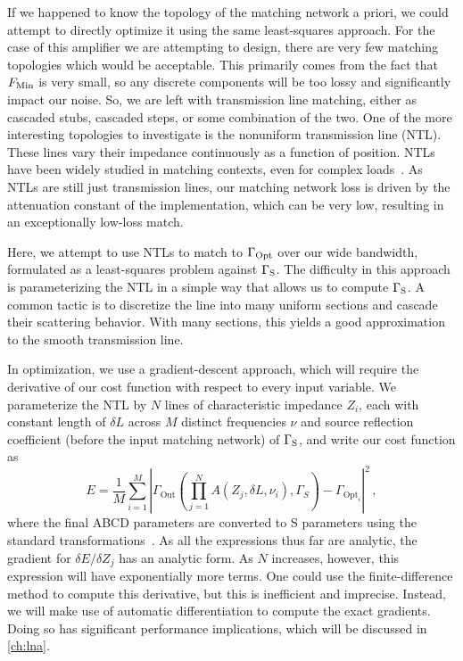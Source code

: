 If we happened to know the topology of the matching network a priori, we could attempt to directly optimize it using the same least-squares approach.
For the case of this amplifier we are attempting to design, there are very few matching topologies which would be acceptable.
This primarily comes from the fact that $F_{\text{Min}}$ is very small, so any discrete components will be too lossy and significantly impact our noise.
So, we are left with transmission line matching, either as cascaded stubs, cascaded steps, or some combination of the two.
One of the more interesting topologies to investigate is the nonuniform transmission line (NTL).
These lines vary their impedance continuously as a function of position.
NTLs have been widely studied in matching contexts, even for complex loads~\cite{xiaoImpedanceMatchingComplex2002}.
As NTLs are still just transmission lines, our matching network loss is driven by the attenuation constant of the implementation, which can be very low, resulting in an exceptionally low-loss match.

Here, we attempt to use NTLs to match to $\Gamma_{\text{Opt}}$ over our wide bandwidth, formulated as a least-squares problem against $\Gamma_{\text{S}}$.
The difficulty in this approach is parameterizing the NTL in a simple way that allows us to compute $\Gamma_{\text{S}}$.
A common tactic is to discretize the line into many uniform sections and cascade their scattering behavior.
With many sections, this yields a good approximation to the smooth transmission line.

In optimization, we use a gradient-descent approach, which will require the derivative of our cost function with respect to every input variable.
We parameterize the NTL by $N$ lines of characteristic impedance $Z_i$, each with constant length of $\delta L$ across $M$ distinct frequencies $\nu$ and source reflection coefficient (before the input matching network) of $\Gamma_{\text{S}}$, and write our cost function as
%
\begin{equation}
    E = \frac{1}{M}\sum_{i=1}^M \left| \Gamma_\text{Out}\left(\prod_{j=1}^N A(Z_j,\delta L, \nu_i),\Gamma_S\right) - \Gamma_{\text{Opt}_i} \right|^2\,,
    \label{eq:tline_cost}
\end{equation}
%
where the final ABCD parameters are converted to S parameters using the standard transformations~\cite{pozarMicrowaveEngineering2012}.
As all the expressions thus far are analytic, the gradient for $\delta E/\delta Z_j$ has an analytic form.
As $N$ increases, however, this expression will have exponentially more terms.
One could use the finite-difference method to compute this derivative, but this is inefficient and imprecise.
Instead, we will make use of automatic differentiation to compute the exact gradients.
Doing so has significant performance implications, which will be discussed in \autoref{ch:lna}.

